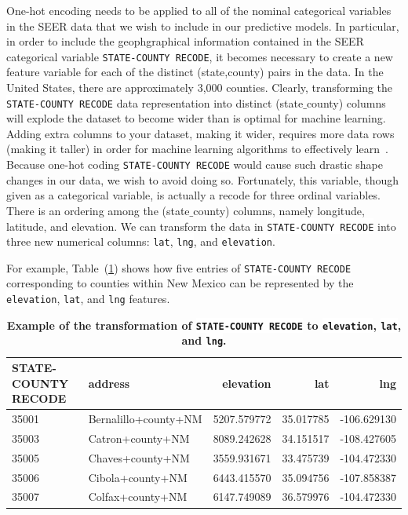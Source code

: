 \documentclass[10pt,letterpaper]{article}
\newcommand{\codewhite}[1]{\colorbox{white}{\texttt{#1}}}
\begin{document}
One-hot encoding needs to be applied to all of the nominal categorical variables in the SEER data that we wish to include in our predictive models.
In particular, in order to include the geophgraphical information contained in the SEER categorical variable \codewhite{STATE-COUNTY RECODE}, it becomes necessary to create a new feature variable for each of the distinct (state,county) pairs in the data. In the United States, there are approximately 3,000 counties. Clearly, transforming the \codewhite{STATE-COUNTY RECODE} data representation into distinct (state$\_$county) columns will explode the dataset to become wider than is optimal for machine learning. Adding extra columns to your dataset, making it wider, requires more data rows (making it taller) in order for machine learning algorithms to effectively learn~\cite{bowles}. Because one-hot coding \codewhite{STATE-COUNTY RECODE} would cause such drastic shape changes in our data, we wish to avoid doing so. Fortunately, this variable, though given as a categorical variable, is actually a recode for three ordinal variables. There is an ordering among the (state$\_$county) columns, namely longitude, latitude, and elevation. We can transform the data in \codewhite{STATE-COUNTY RECODE} into three new numerical columns: \codewhite{lat}, \codewhite{lng}, and \codewhite{elevation}.

For example, Table~(\ref{tab:nmhead}) shows how five entries of \codewhite{STATE-COUNTY RECODE} corresponding to counties within New Mexico can be represented by the 
\codewhite{elevation}, \codewhite{lat}, and \codewhite{lng} features.

\begin{table}[!ht]
\begin{adjustwidth}{-2.25in}{0in} %
\caption{\label{tab:nmhead} {\bf Example of the transformation of \codewhite{STATE-COUNTY RECODE} to \codewhite{elevation}, \codewhite{lat}, and \codewhite{lng}.}}
\begin{tabular}{llrrr}
\toprule
 STATE-COUNTY RECODE &               address &    elevation &        lat &         lng \\
\midrule
35001 &  Bernalillo+county+NM &  5207.579772 &  35.017785 & -106.629130 \\
35003 &      Catron+county+NM &  8089.242628 &  34.151517 & -108.427605 \\
35005 &      Chaves+county+NM &  3559.931671 &  33.475739 & -104.472330 \\
35006 &      Cibola+county+NM &  6443.415570 &  35.094756 & -107.858387 \\
35007 &      Colfax+county+NM &  6147.749089 &  36.579976 & -104.472330 \\
\bottomrule
\end{tabular}
\end{adjustwidth}
\end{table}
\end{document}
